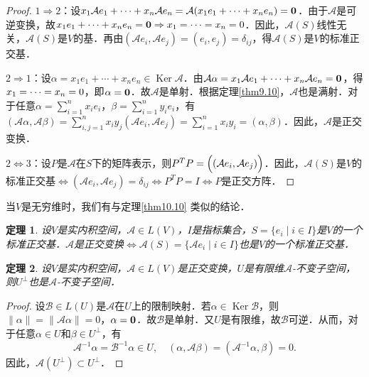\documentclass[a4paper,fontset=windows]{ctexbook}
\newtheorem{theorem}{定理}[chapter]
\theoremstyle{definition}
\DeclareMathOperator{\Ker}{Ker}
\begin{document}
\begin{proof}
$1\Rightarrow 2$：设$x_1\mathcal{A}e_1+\cdots+x_n\mathcal{A}e_n=\mathcal{A}(x_1e_1+\cdots+x_ne_n)={\bf 0}$．由于$\mathcal{A}$是可逆变换，故$x_1e_1+\cdots+x_ne_n={\bf 0}\Rightarrow x_1=\cdots=x_n=0$．因此，$\mathcal{A}(S)$线性无关，$\mathcal{A}(S)$是$V$的基．再由$(\mathcal{A}e_i,\mathcal{A}e_j)=(e_i,e_j)=\delta_{ij}$，得$\mathcal{A}(S)$是$V$的标准正交基．

$2\Rightarrow 1$：设$\alpha=x_1e_1+\cdots+x_ne_n\in\Ker\mathcal{A}$．由$\mathcal{A}\alpha=x_1\mathcal{A}e_1+\cdots+x_n\mathcal{A}e_n={\bf 0}$，得$x_1=\cdots= \\ x_n=0$，即$\alpha={\bf 0}$．故$\mathcal{A}$是单射．根据定理\ref{thm9.10}，$\mathcal{A}$也是满射．对于任意$\alpha=\sum\limits_{i=1}^nx_ie_i$，$\beta=\sum\limits_{i=1}^ny_ie_i$，有$(\mathcal{A}\alpha,\mathcal{A}\beta)=\sum\limits_{i,j=1}^nx_iy_j(\mathcal{A}e_i,\mathcal{A}e_j)=\sum\limits_{i=1}^nx_iy_i=(\alpha,\beta)$．因此，$\mathcal{A}$是正交变换．

$2\Leftrightarrow 3$：设$P$是$\mathcal{A}$在$S$下的矩阵表示，则$P^TP=\Bigl((\mathcal{A}e_i,\mathcal{A}e_j)\Bigr)$．因此，$\mathcal{A}(S)$是$V$的标准正交基$\Leftrightarrow(\mathcal{A}e_i,\mathcal{A}e_j)=\delta_{ij}\Leftrightarrow P^TP=I\Leftrightarrow P$是正交方阵．
\end{proof}

当$V$是无穷维时，我们有与定理\ref{thm10.10} 类似的结论．

\begin{theorem}\label{thm10.11}
设$V$是实内积空间，$\mathcal{A}\in L(V)$，$I$是指标集合，$S=\{e_i\mid i\in I\}$是$V$的一个标准正交基．$\mathcal{A}$是正交变换$\Leftrightarrow\mathcal{A}(S)=\{\mathcal{A}e_i\mid i\in I\}$也是$V$的一个标准正交基．
\end{theorem}

\begin{theorem}\label{thm10.12}
设$V$是实内积空间，$\mathcal{A}\in L(V)$是正交变换，$U$是有限维$\mathcal{A}$-不变子空间，则$U^\perp$也是$\mathcal{A}$-不变子空间．
\end{theorem}

\begin{proof}
设$\mathcal{B}\in L(U)$是$\mathcal{A}$在$U$上的限制映射．若$\alpha\in\Ker\mathcal{B}$，则$\|\alpha\|=\|\mathcal{A}\alpha\|=0$，$\alpha={\bf 0}$．故$\mathcal{B}$是单射．又$U$是有限维，故$\mathcal{B}$可逆．从而，对于任意$\alpha\in U$和$\beta\in U^\perp$，有
$$\mathcal{A}^{-1}\alpha=\mathcal{B}^{-1}\alpha\in U,\quad(\alpha,\mathcal{A}\beta)=(\mathcal{A}^{-1}\alpha,\beta)=0.$$
因此，$\mathcal{A}(U^\perp)\subset U^\perp$．
\end{proof}
\end{document}
